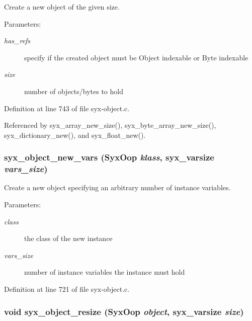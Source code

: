 Create a new object of the given size.

\begin{Desc}
\item[Parameters:]
\begin{description}
\item[{\em has\_\-refs}]specify if the created object must be Object indexable or Byte indexable \item[{\em size}]number of objects/bytes to hold \end{description}
\end{Desc}


Definition at line 743 of file syx-object.c.

Referenced by syx\_\-array\_\-new\_\-size(), syx\_\-byte\_\-array\_\-new\_\-size(), syx\_\-dictionary\_\-new(), and syx\_\-float\_\-new().\hypertarget{syx-object_8c_f94f2c1c65aaf0962fbcc022519e189a}{
\subsubsection{ syx\_\-object\_\-new\_\-vars ({\bf SyxOop} {\em klass}, \/  {\bf syx\_\-varsize} {\em vars\_\-size})}}
\label{syx-object_8c_f94f2c1c65aaf0962fbcc022519e189a}


Create a new object specifying an arbitrary number of instance variables.

\begin{Desc}
\item[Parameters:]
\begin{description}
\item[{\em class}]the class of the new instance \item[{\em vars\_\-size}]number of instance variables the instance must hold \end{description}
\end{Desc}


Definition at line 721 of file syx-object.c.\hypertarget{syx-object_8c_c164e22639b461973d79531c6bf62a4e}{
\subsubsection{\setlength{\rightskip}{0pt plus 5cm}void syx\_\-object\_\-resize ({\bf SyxOop} {\em object}, \/  {\bf syx\_\-varsize} {\em size})}}
\label{syx-object_8c_c164e22639b461973d79531c6bf62a4e}


